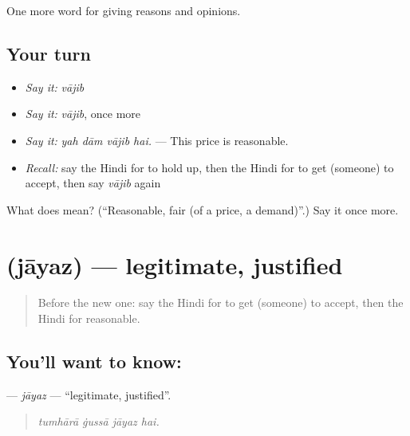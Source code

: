 \begin{grammarlens}[title={What you've built}]
One more word for giving reasons and opinions.
\end{grammarlens}

\subsection*{Your turn}
\begin{itemize}
\raggedright
  \item \emph{Say it:} \emph{vājib}
  \item \emph{Say it:} \emph{vājib}, once more
  \item \emph{Say it:} \emph{yah dām vājib hai.} — This price is reasonable.
  \item \emph{Recall:} say the Hindi for to hold up, then the Hindi for to get (someone) to accept, then say \emph{vājib} again
\end{itemize}

\begin{tcolorbox}[breakable,colback=teal!4,colframe=teal!35!black,title={Before you move on}]
What does  mean? (\textquotedblleft{}Reasonable, fair (of a price, a demand)\textquotedblright{}.) Say it once more.
\end{tcolorbox}
\section[\texorpdfstring{\hi{जायज़} (jāyaz)}{जायज़ (jāyaz)}]{ (jāyaz) — legitimate, justified}

\label{lesson:HI-C366-jayaz}



\begin{quote}
Before the new one: say the Hindi for to get (someone) to accept, then the Hindi for reasonable.
\end{quote}

\subsection*{You'll want to know: }
\textbf{} — \emph{jāyaz} — \textquotedblleft{}legitimate, justified\textquotedblright{}.

\begin{quote}
   
\end{quote}

\begin{quote}
\emph{tumhārā ġussā jāyaz hai.}
\end{quote}

